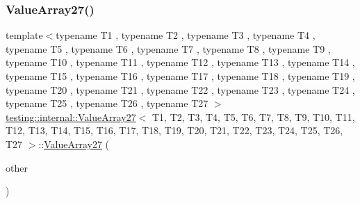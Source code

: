 \mbox{\label{classtesting_1_1internal_1_1ValueArray27_a84702665e9f3180487c8061b2981202d}} 
\subsubsection{\texorpdfstring{ValueArray27()}{ValueArray27()}\hspace{0.1cm}{\footnotesize\ttfamily [2/2]}}
{\footnotesize\ttfamily template$<$typename T1 , typename T2 , typename T3 , typename T4 , typename T5 , typename T6 , typename T7 , typename T8 , typename T9 , typename T10 , typename T11 , typename T12 , typename T13 , typename T14 , typename T15 , typename T16 , typename T17 , typename T18 , typename T19 , typename T20 , typename T21 , typename T22 , typename T23 , typename T24 , typename T25 , typename T26 , typename T27 $>$ \\
\mbox{\hyperlink{classtesting_1_1internal_1_1ValueArray27}{testing\+::internal\+::\+Value\+Array27}}$<$ T1, T2, T3, T4, T5, T6, T7, T8, T9, T10, T11, T12, T13, T14, T15, T16, T17, T18, T19, T20, T21, T22, T23, T24, T25, T26, T27 $>$\+::\mbox{\hyperlink{classtesting_1_1internal_1_1ValueArray27}{Value\+Array27}} (\begin{DoxyParamCaption}\item[{const \mbox{\hyperlink{classtesting_1_1internal_1_1ValueArray27}{Value\+Array27}}$<$ T1, T2, T3, T4, T5, T6, T7, T8, T9, T10, T11, T12, T13, T14, T15, T16, T17, T18, T19, T20, T21, T22, T23, T24, T25, T26, T27 $>$ \&}]{other }\end{DoxyParamCaption})\hspace{0.3cm}{\ttfamily [inline]}}



